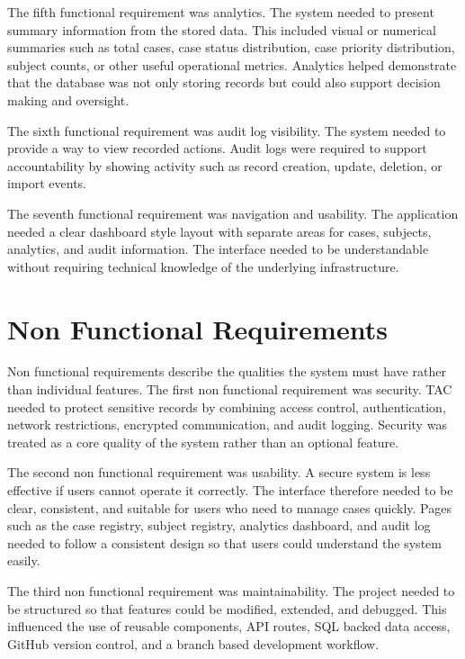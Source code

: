 The fifth functional requirement was analytics. The system needed to present summary information from the stored data. This included visual or numerical summaries such as total cases, case status distribution, case priority distribution, subject counts, or other useful operational metrics. Analytics helped demonstrate that the database was not only storing records but could also support decision making and oversight.

The sixth functional requirement was audit log visibility. The system needed to provide a way to view recorded actions. Audit logs were required to support accountability by showing activity such as record creation, update, deletion, or import events.

The seventh functional requirement was navigation and usability. The application needed a clear dashboard style layout with separate areas for cases, subjects, analytics, and audit information. The interface needed to be understandable without requiring technical knowledge of the underlying infrastructure.


\section{Non Functional Requirements}

Non functional requirements describe the qualities the system must have rather than individual features. The first non functional requirement was security. TAC needed to protect sensitive records by combining access control, authentication, network restrictions, encrypted communication, and audit logging. Security was treated as a core quality of the system rather than an optional feature.

The second non functional requirement was usability. A secure system is less effective if users cannot operate it correctly. The interface therefore needed to be clear, consistent, and suitable for users who need to manage cases quickly. Pages such as the case registry, subject registry, analytics dashboard, and audit log needed to follow a consistent design so that users could understand the system easily.

The third non functional requirement was maintainability. The project needed to be structured so that features could be modified, extended, and debugged. This influenced the use of reusable components, API routes, SQL backed data access, GitHub version control, and a branch based development workflow.

